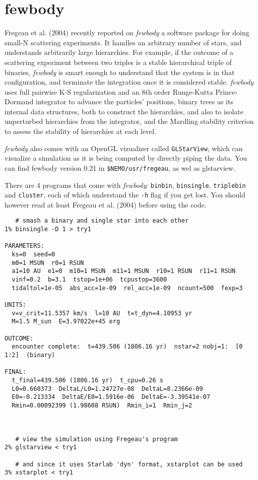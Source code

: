 \section{fewbody}

Fregeau et al. (2004) recently reported on
{\it fewbody} a software package for doing
small-N scattering experiments. It handles an arbitrary number of stars,
and understands arbitrarily large hierarchies. For example, if the
outcome of a scattering experiment between two triples is a stable
hierarchical triple of binaries, {\it fewbody} is smart enough to
understand that the system is in that configuration, and terminate the
integration once it is considered stable. {\it fewbody} uses full pairwise
K-S regularization and an 8th order Runge-Kutta Prince-Dormand
integrator to advance the particles' positions, binary trees as its
internal data structures, both to construct the hierarchies, and also
to isolate unperturbed hierarchies from the integrator, and the
Mardling stability criterion to assess the stability of hierarchies at
each level.

{\it fewbody} also comes with an OpenGL vizualizer called {\tt GLStarView},
which can visualize a simulation as it is being computed by directly
piping the data. You can find fewbody  version 0.21 in {\tt \$NEMO/usr/fregeau},
as wel as glstarview.

There are  4 programs that come with {\it fewbody}:
{\tt binbin}, {\tt binsingle}, {\tt triplebin} and {\tt cluster},
 each of which understand the
{\tt -h} flag if you get lost. You should however read at least
Fregeau et al. (2004) before using the code.

\footnotesize\begin{verbatim}
   # smash a binary and single star into each other
1% binsingle -D 1 > try1

PARAMETERS:
  ks=0  seed=0
  m0=1 MSUN  r0=1 RSUN
  a1=10 AU  e1=0  m10=1 MSUN  m11=1 MSUN  r10=1 RSUN  r11=1 RSUN
  vinf=0.2  b=3.1  tstop=1e+06  tcpustop=3600
  tidaltol=1e-05  abs_acc=1e-09  rel_acc=1e-09  ncount=500  fexp=3
 
UNITS:
  v=v_crit=11.5357 km/s  l=10 AU  t=t_dyn=4.10953 yr
  M=1.5 M_sun  E=3.97022e+45 erg
 
OUTCOME:
  encounter complete:  t=439.506 (1806.16 yr)  nstar=2 nobj=1:  [0 1:2]  (binary)
 
FINAL:
  t_final=439.506 (1806.16 yr)  t_cpu=0.26 s
  L0=0.660373  DeltaL/L0=1.24727e-08  DeltaL=8.2366e-09
  E0=-0.213334  DeltaE/E0=1.5916e-06  DeltaE=-3.39541e-07
  Rmin=0.00092399 (1.98608 RSUN)  Rmin_i=1  Rmin_j=2



   # view the simulation using Fregeau's program
2% glstarview < try1

   # and since it uses Starlab 'dyn' format, xstarplot can be used
3% xstarplot < try1

\end{verbatim}\normalsize

